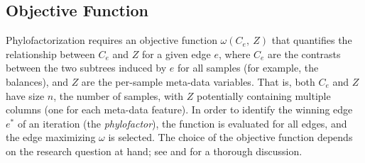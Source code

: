 

\subsection{Objective Function}
\label{ch:Factorization:sec:Methods:sub:ObjectiveFunction}


Phylofactorization requires an objective function $\omega(C_e, ~Z)$
that quantifies the relationship between $C_e$ and $Z$ for a given edge $e$,
where $C_e$ are the contrasts between the two subtrees induced by $e$ for all samples (for example, the balances),
and $Z$ are the per-sample meta-data variables.
That is, both $C_e$ and $Z$ have size $n$, the number of samples,
with $Z$ potentially containing multiple columns (one for each meta-data feature).
In order to identify the winning edge $e^*$ of an iteration (the \emph{phylofactor}),
the function is evaluated for all edges, and the edge maximizing $\omega$ is selected.
The choice of the objective function depends on the research question at hand;
see  and  for a thorough discussion.

